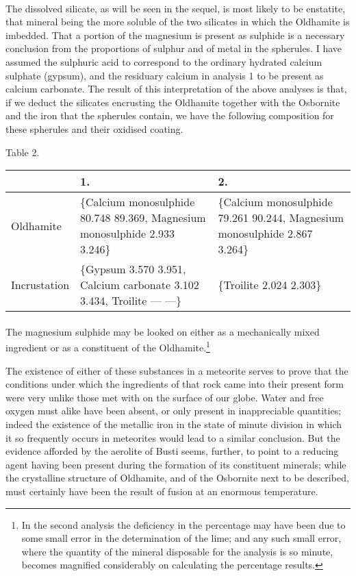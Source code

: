 \documentclass[a4paper, 12pt, oneside]{article}
\begin{document}
\paragraph{}
The dissolved silicate, as will be seen in the sequel, is most likely to be enstatite, that mineral being the more soluble of the two silicates in which the Oldhamite is imbedded. That a portion of the magnesium is present as sulphide is a necessary conclusion from the proportions of sulphur and of metal in the spherules. I have assumed the sulphuric acid to correspond to the ordinary hydrated calcium sulphate (gypsum), and the residuary calcium in analysis 1 to be present as calcium carbonate. The result of this interpretation of the above analyses is that, if we deduct the silicates encrusting the Oldhamite together with the Osbornite and the iron that the spherules contain, we have the following composition for these spherules and their oxidised coating.
\begin{center}
Table 2.
\end{center}
\begin{table}[H]
    \centering
    \footnotesize
    \begin{tabular}{p{45mm} p{30mm} p{30mm}}
        ~ & 1. & 2. \\ \hline
        Oldhamite & \{Calcium monosulphide 80.748 89.369, Magnesium monosulphide 2.933 3.246\} & \{Calcium monosulphide 79.261 90.244, Magnesium monosulphide 2.867 3.264\} \\  
        Incrustation & \{Gypsum 3.570 3.951, Calcium carbonate 3.102 3.434, Troilite --- ---\} & \{Troilite 2.024 2.303\} \\
    \end{tabular}
\end{table}
\paragraph{}
The magnesium sulphide may be looked on either as a mechanically mixed ingredient or as a constituent of the Oldhamite.\footnote{In the second analysis the deficiency in the percentage may have been due to some small error in the determination of the lime; and any such small error, where the quantity of the mineral disposable for the analysis is so minute, becomes magnified considerably on calculating the percentage results.}

The existence of either of these substances in a meteorite serves to prove that the conditions under which the ingredients of that rock came into their present form were very unlike those met with on the surface of our globe. Water and free oxygen must alike have been absent, or only present in inappreciable quantities; indeed the existence of the metallic iron in the state of minute division in which it so frequently occurs in meteorites would lead to a similar conclusion. But the evidence afforded by the aerolite of Busti seems, further, to point to a reducing agent having been present during the formation of its constituent minerals; while the crystalline structure of Oldhamite, and of the Osbornite next to be described, must certainly have been the result of fusion at an enormous temperature.
\end{document}
